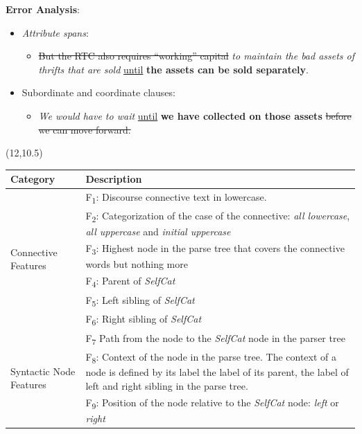 \documentclass{article}
\def\CHead#1{\begin{center}\noindent{\LARGE\color{DarkBlue} #1}\end{center}}
\renewcommand{\LARGE}{\fontsize{43}{54}\selectfont}
\begin{document}
\begin{textblock}{10}
\textbf{Error Analysis}:
\begin{itemize}
\item \textit{Attribute spans}:
\begin{itemize}
\item \st{But the RTC also requires ``working'' capital} \textit{to maintain the bad assets of thrifts that are sold} \underline{until} \textbf{the assets can be sold separately}.
\end{itemize}
\item Subordinate and coordinate clauses:
\begin{itemize}
\item \textit{We would have to wait} \underline{until} \textbf{we have collected on those assets} \st{before we can move forward.}
\end{itemize}
\end{itemize}

\end{textblock}



\begin{textblock}{10}(12,10.5)
\CHead{V. Features}

\begin{table}[!htb]
  \centering
  \begin{tabular}{|p{}|p{}|}
  \hline
  
    \textbf{Category} & \textbf{Description}\\
    \hline
    \hline
    \multirow{6}{*}{\parbox{.25\textwidth}{Connective Features}} 
    & F\textsubscript{1}: Discourse connective text in lowercase. \\ \cline{2-2}
    & F\textsubscript{2}: Categorization of the case of the connective: \textit{all lowercase}, \textit{all uppercase} and \textit{initial uppercase} \\ \cline{2-2}
    & F\textsubscript{3}: Highest node in the parse tree that covers the connective words but nothing more \\ \cline{2-2}
    & F\textsubscript{4}: Parent of \textit{SelfCat} \\ \cline{2-2}
    & F\textsubscript{5}: Left sibling of \textit{SelfCat} \\ \cline{2-2}
    & F\textsubscript{6}: Right sibling of \textit{SelfCat} \\ \hline
 
    \multirow{3}{*}{\parbox{.25\textwidth}{Syntactic Node Features}} 
    & F\textsubscript{7} Path from the node to the \textit{SelfCat} node in the parser tree \\ \cline{2-2}
    & F\textsubscript{8}: Context of the node in the parse tree. The context of a node is defined by its label the label of its parent, the label of left and right sibling in the parse tree. \\ \cline{2-2}
    & F\textsubscript{9}: Position of the node relative to the \textit{SelfCat} node: \textit{left} or \textit{right} \\ \hline
 
  \end{tabular}
\end{table}
\end{textblock}
\end{document}
